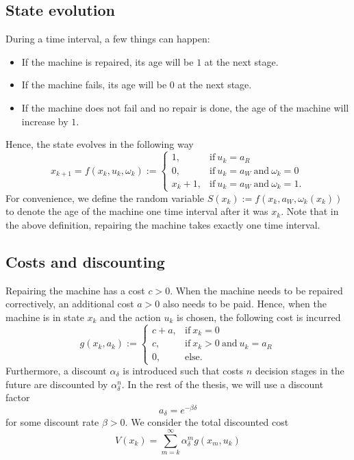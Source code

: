 \subsection{State evolution}
During a time interval, a few things can happen:
\begin{itemize}
	\item If the machine is repaired, its age will be $1$ at the next stage.
	\item If the machine fails, its age will be $0$ at the next stage.
	\item If the machine does not fail and no repair is done, the age of the machine will increase by $1$.
\end{itemize}
Hence, the state evolves in the following way
$$
x_{k+1}=f(x_k,u_k,\omega_k):=\begin{cases}
1,&\text{if}\ u_k=a_R \\
0,&\text{if}\ u_k=a_W\ \text{and}\ \omega_k=0 \\
x_k+1,&\text{if}\ u_k=a_W\ \text{and}\ \omega_k=1.
\end{cases}
$$
For convenience, we define the random variable $S(x_k):=f(x_k,a_W,\omega_k(x_k))$ to denote the age of the machine one time interval after it was $x_k$.
Note that in the above definition, repairing the machine takes exactly one time interval.

\subsection{Costs and discounting}
Repairing the machine has a cost $c>0$.
When the machine needs to be repaired correctively, an additional cost $a>0$ also needs to be paid.
Hence, when the machine is in state $x_k$ and the action $u_k$ is chosen, the following cost is incurred
$$
g(x_k,a_k):=\begin{cases}
c+a,&\text{if}\ x_k=0 \\
c,&\text{if}\ x_k>0\ \text{and}\ u_k=a_R \\
0,&\text{else}.
\end{cases}
$$
Furthermore, a discount $\alpha_\delta$ is introduced such that costs $n$ decision stages in the future are discounted by $\alpha_\delta^n$.
In the rest of the thesis, we will use a discount factor
$$
a_\delta=e^{-\beta\delta}
$$
for some discount rate $\beta>0$.
We consider the total discounted cost
$$
V(x_k)=\sum\limits_{m=k}^\infty \alpha_\delta^mg(x_m,u_k)
$$

